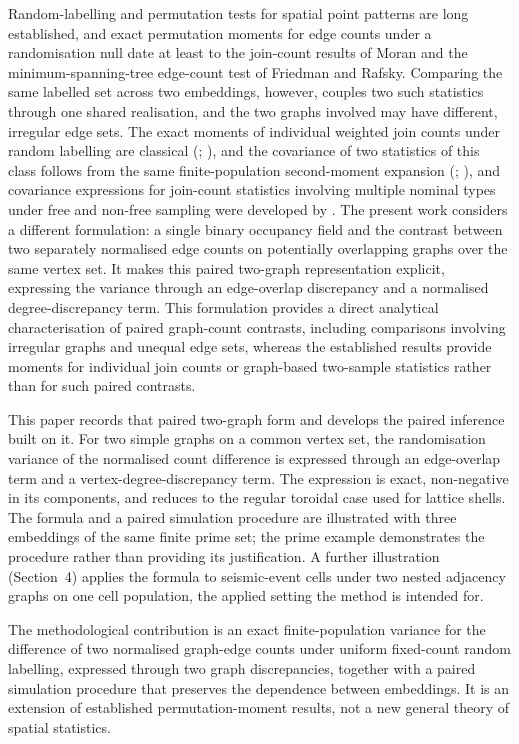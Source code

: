 \documentclass[final,1p,times,authoryear]{elsarticle}
\theoremstyle{definition}
\begin{document}
Random-labelling and permutation tests for spatial point patterns are long
established, and exact permutation moments for edge counts under a
randomisation null date at least to the join-count results of Moran and the
minimum-spanning-tree edge-count test of Friedman and Rafsky. Comparing the same labelled
set across two embeddings, however, couples two such statistics through one
shared realisation, and the two graphs involved may have different, irregular
edge sets. The exact moments of individual weighted join counts under random
labelling are classical (\citet{CLIFF-ORD-1981}; \citet{SOKAL-ODEN-1978}), and
the covariance of two statistics of this class follows from the same
finite-population second-moment expansion (\citet{DANIELS-1944};
\citet{HOEFFDING-1948}), and covariance expressions for join-count
statistics involving multiple nominal types under free and non-free sampling
were developed by \citet{EPPERSON-2003}. The present work considers a
different formulation: a single binary occupancy field and the contrast
between two separately normalised edge counts on potentially overlapping
graphs over the same vertex set. It makes this paired two-graph
representation explicit, expressing the variance through an edge-overlap
discrepancy and a normalised degree-discrepancy term. This
formulation provides a direct analytical characterisation of paired
graph-count contrasts, including comparisons involving irregular graphs and
unequal edge sets, whereas the established results provide moments for
individual join counts or graph-based two-sample statistics rather than for
such paired contrasts.

This paper records that paired two-graph form and develops the paired
inference built on it. For two simple
graphs on a common vertex set, the randomisation variance of the normalised
count difference is expressed through an edge-overlap term and a
vertex-degree-discrepancy term. The expression is exact, non-negative in its
components, and reduces to the regular toroidal case used for lattice shells.
The formula and a paired simulation procedure are illustrated with three
embeddings of the same finite prime set; the prime example demonstrates the
procedure rather than providing its justification. A further illustration
(Section~4) applies the formula to seismic-event cells under two nested
adjacency graphs on one cell population, the applied setting the method is
intended for.

The methodological contribution is an exact finite-population variance for the
difference of two normalised graph-edge counts under uniform fixed-count
random labelling, expressed through two graph discrepancies, together with a
paired simulation procedure that preserves the dependence between embeddings.
It is an extension of established permutation-moment results, not a new
general theory of spatial statistics.
\end{document}
